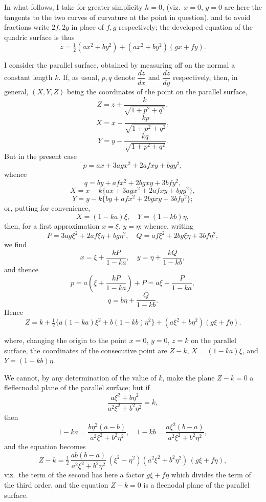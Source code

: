 \documentclass[11pt,a4paper]{article}
\begin{document}
\noindent In what follows, I take for greater simplicity $h = 0$, (viz.\ $x = 0$, $y = 0$ are here the tangents to the two curves of curvature at the point in question), and to avoid fractions write $2f, 2g$ in place of $f, g$ respectively; the developed equation of the quadric surface is thus
\[
z = \tfrac{1}{2}(ax^{2} + by^{2}) + (ax^{2} + by^{2})(gx + fy).
\]

I consider the parallel surface, obtained by measuring off on the normal a constant length $k$. If, as usual, $p, q$ denote $\dfrac{dz}{dx}$ and $\dfrac{dz}{dy}$ respectively, then, in general, $(X, Y, Z)$ being the coordinates of the point on the parallel surface,
\[
Z = z + \frac{k}{\sqrt{1 + p^{2} + q^{2}}},
\]
\[
X = x - \frac{kp}{\sqrt{1 + p^{2} + q^{2}}},
\]
\[
Y = y - \frac{kq}{\sqrt{1 + p^{2} + q^{2}}}.
\]
But in the present case
\[
p = ax + 3agx^{2} + 2afxy + bgy^{2},
\]
whence
\[
q = by + afx^{2} + 2bgxy + 3bfy^{2},
\]
\[
X = x - k\{ax + 3agx^{2} + 2afxy + bgy^{2}\},
\]
\[
Y = y - k\{by + afx^{2} + 2bgxy + 3bfy^{2}\};
\]
or, putting for convenience,
\[
X = (1 - ka)\xi, \quad Y = (1 - kb)\eta,
\]
then, for a first approximation $x = \xi$, $y = \eta$; whence, writing
\[
P = 3ag\xi^{2} + 2af\xi\eta + bg\eta^{2}, \quad Q = af\xi^{2} + 2bg\xi\eta + 3bf\eta^{2},
\]
we find
\[
x = \xi + \frac{kP}{1 - ka}, \quad y = \eta + \frac{kQ}{1 - kb},
\]
and thence
\[
p = a\left(\xi + \frac{kP}{1 - ka}\right) + P = a\xi + \frac{P}{1 - ka},
\]
\[
q = b\eta + \frac{Q}{1 - kb}.
\]
Hence
\[
Z = k + \tfrac{1}{2}\{a(1 - ka)\xi^{2} + b(1 - kb)\eta^{2}\} + (a\xi^{2} + b\eta^{2})(g\xi + f\eta).
\]

\newpage


\noindent where, changing the origin to the point $x = 0$, $y = 0$, $z = k$ on the parallel surface, the coordinates of the consecutive point are $Z - k$, $X = (1 - ka)\xi$, and $Y = (1 - kb)\eta$.

\medskip

We cannot, by any determination of the value of $k$, make the plane $Z - k = 0$ a fleflecnodal plane of the parallel surface; but if
\[
\frac{a\xi^{2} + b\eta^{2}}{a^{2}\xi^{2} + b^{2}\eta^{2}} = k,
\]
then
\[
1 - ka = \frac{b\eta^{2}(a - b)}{a^{2}\xi^{2} + b^{2}\eta^{2}}, \quad 1 - kb = \frac{a\xi^{2}(b - a)}{a^{2}\xi^{2} + b^{2}\eta^{2}},
\]
and the equation becomes
\[
Z - k = \tfrac{1}{2}\,\frac{ab(b - a)}{a^{2}\xi^{2} + b^{2}\eta^{2}}\,(\xi^{2} - \eta^{2})(a^{2}\xi^{2} + b^{2}\eta^{2})\,(g\xi + f\eta),
\]
viz.\ the term of the second has here a factor $g\xi + f\eta$ which divides the term of the third order, and the equation $Z - k = 0$ is a flecnodal plane of the parallel surface.
\end{document}
